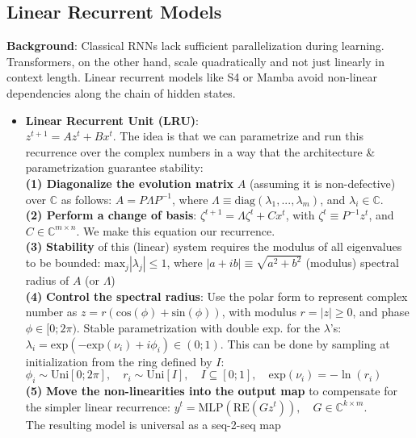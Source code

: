 \subsection{Linear Recurrent Models}
\textbf{Background}: Classical RNNs lack sufficient parallelization during learning. Transformers, on the other hand, scale quadratically and not just linearly in context length. \textrightarrow Linear recurrent models like S4 or Mamba avoid non-linear dependencies along the chain of hidden states.
\begin{itemize}
    \item \textbf{Linear Recurrent Unit (LRU)}: \\
    $z^{t+1} = Az^t + Bx^t$. The idea is that we can parametrize and run this recurrence over the complex numbers in a way that the architecture \& parametrization guarantee stability: \\
    \textbf{(1) Diagonalize the evolution matrix} $A$ (assuming it is non-defective) over $\mathbb{C}$ as follows: $A = P\Lambda P^{-1}$, where $\Lambda \equiv \text{diag}(\lambda_1,...,\lambda_m)$, and $\lambda_i \in \mathbb{C}$. \\
    \textbf{(2) Perform a change of basis}: $\zeta^{t+1} = \Lambda\zeta^t + Cx^t$, with $\zeta^t \equiv P^{-1}z^t$, and $C \in \mathbb{C}^{m \times n}$. We make this equation our recurrence.\\
    \textbf{(3)} \textbf{Stability} of this (linear) system requires the modulus of all eigenvalues to be bounded: $\text{max}_j|\lambda_j| \leq 1$, where $|a+ib| \equiv \sqrt{a^2 + b^2}$ (modulus) \textrightarrow spectral radius of $A$ (or $\Lambda$) \\
    \textbf{(4)} \textbf{Control the spectral radius}: Use the polar form to represent complex number as $z = r(\text{cos}(\phi) + \text{sin}(\phi))$, with modulus $r = |z| \geq 0$, and phase $\phi \in [0; 2\pi)$. Stable parametrization with double exp. for the $\lambda$'s: \\
    $\lambda_i = \text{exp}(-\text{exp}(\nu_i) + i\phi_i) \in (0; 1)$. This can be done by sampling at initialization from the ring defined by $I$: \\
    $\phi_i \sim \text{Uni}[0; 2\pi], \quad r_i \sim \text{Uni}[I], \quad I \subseteq [0; 1], \quad \text{exp}(\nu_i) = -\ln(r_i)$ \\
    \textbf{(5)} \textbf{Move the non-linearities into the output map} to compensate for the simpler linear recurrence: $y^t = \text{MLP}(\text{RE}(Gz^t)), \quad G \in \mathbb{C}^{k \times m}$. \\
    \textrightarrow The resulting model is universal as a seq-2-seq map
\end{itemize}


